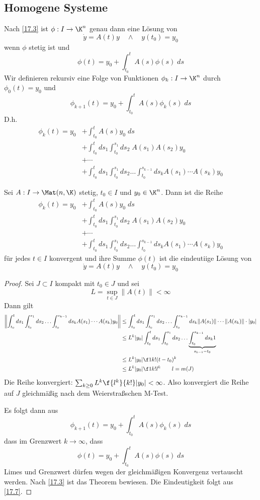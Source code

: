 \documentclass[a4paper,10pt]{scrbook}
\begin{document}
\subsection{Homogene Systeme}

Nach \ref{17.3} ist $\phi:I \to \K^n$ genau dann eine Lösung von
\[
	\dot y = A(t) y  \quad \land\quad y(t_0) = y_0
\]
wenn $\phi$ stetig ist und
\[
	\phi(t) = y_0 + \int_{t_0}^t A(s) \phi(s)\; ds
\]
Wir definieren rekursiv eine Folge von Funktionen $\phi_k: I \to \K^n$ durch $\phi_0(t) = y_0$ und
\[
	\phi_{k+1}(t) = y_0 + \int_{t_0}^tA(s)\phi_k(s) \;ds
\]
D.h.
\begin{align*}
	\phi_k(t) = y_0 &+ \int_{t_0}^tA(s)y_0\;ds \\
					&+ \int_{t_0}^tds_1\int_{t_0}^{s_1}ds_2 \; A(s_1)A(s_2)y_0 \\
		&+ \dotsb \\
	 &+ \int_{t_0}^tds_1 \int_{t_0}^{s_1}ds_2 \dotso \int_{t_0}^{s_{k-1}}ds_k A(s_1)\dotsb A(s_k)y_0
\end{align*}

\begin{thm}
	\label{17.8}
	Sei $A:I \to\Mat(n,\K)$ stetig, $t_0\in I$ und $y_0\in \K^n$. 
	Dann ist die Reihe 
	\begin{align*}
		\phi_k(t) = y_0 &+ \int_{t_0}^tA(s)y_0\;ds \\
						&+ \int_{t_0}^tds_1\int_{t_0}^{s_1}ds_2 \; A(s_1)A(s_2)y_0 \\
			&+ \dotsb \\
		 &+ \int_{t_0}^tds_1 \int_{t_0}^{s_1}ds_2 \dotso \int_{t_0}^{s_{k-1}}ds_k A(s_1)\dotsb A(s_k)y_0
	\end{align*}
	für jedes $t\in I$ konvergent und ihre Summe $\phi(t)$ ist die eindeutiige Lösung von 
	\[
		\dot y = A(t) y  \quad \land\quad y(t_0) = y_0
	\]
	\begin{proof}
		Sei $J\subset I$ kompakt mit $t_0\in J$ und sei
		\[
			L = \sup_{t\in J}\|A(t)\| < \infty
		\]
		Dann gilt
		\begin{align*}
			\left\|\int_{t_0}^t ds_1 \int_{t_0}^{s_1}ds_2 \dotso \int_{t_0}^{s_{k-1}}ds_k A(s_1) \dotsb A(s_k) y_0\right\|
			& \le \int_{t_0}^t ds_1 \int_{t_0}^{s_1}ds_2 \dotso \int_{t_0}^{s_{k-1}}ds_k \|A(s_1)\|\dotsb \|A(s_k)\|\cdot |y_0|\\
			& \le L^k|y_0| 	\int_{t_0}^t ds_1 \int_{t_0}^{s_1}ds_2 \dotso \underbrace{\int_{t_0}^{s_{k-1}}ds_k 1}_{s_{k-1}-t_0}\\ 
			& \le L^k|y_0| \f 1{k!}(t-t_0)^k\\
			& \le L^k|y_0| \f 1{k!} l^k \qquad l = m(J)
		\end{align*}
		Die Reihe konvergiert: $\sum_{k\ge 0}L^k \f{l^k}{k!}|y_0| < \infty$.
		Also konvergiert die Reihe auf $J$ gleichmäßig nach dem Weierstraßschen M-Test.

		Es folgt dann aus
		\[
			\phi_{k+1}(t) = y_0 + \int_{t_0}^t A(s) \phi_{k}(s) \;ds
		\]
		dass im Grenzwert $k\to \infty$, dass
		\[
			\phi(t) = y_0 + \int_{t_0}^t A(s) \phi(s)\; ds
		\]
		Limes und Grenzwert dürfen wegen der gleichmäßigen Konvergenz vertauscht werden.
		Nach \ref{17.3} ist das Theorem bewiesen.
		Die Eindeutigkeit folgt aus \ref{17.7}.
	\end{proof}
\end{thm}
\end{document}
